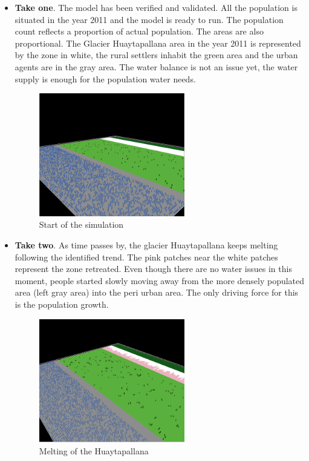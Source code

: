 \documentclass{article}
\begin{document}
\begin{itemize}
\item {\bf Take one}. The model has been verified and validated. All the population is situated in the year 2011 and the model is ready to run. The population count reflects a proportion of actual population. The areas are also proportional. The Glacier Huaytapallana area in the year 2011 is represented by the zone in white, the rural settlers inhabit the green area and the urban agents are in the gray area. The water balance is not an issue yet, the water supply is enough for the population water needs. 

\begin{figure}[h]
  \centering
  \includegraphics[width=0.6\textwidth]{esc1}
  \caption{Start of the simulation}
  \label{esc1}
\end{figure}

\item {\bf Take two}. As time passes by, the glacier Huaytapallana keeps melting following the identified trend. The pink patches near the white patches represent the zone retreated. Even though there are no water issues in this moment, people started slowly moving away from the more densely populated area (left gray area) into the peri urban area. The only driving force for this is the population growth. 

\begin{figure}[h]
  \centering
  \includegraphics[width=0.6\textwidth]{esc2}
  \caption{Melting of the Huaytapallana}
  \label{esc2}
\end{figure}


\end{itemize}
\end{document}
